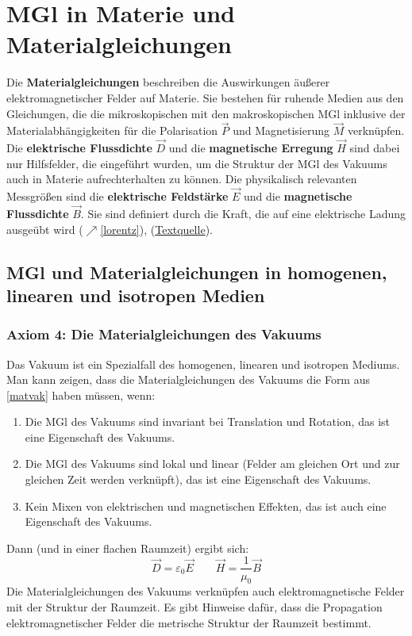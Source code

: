  \section{MGl in Materie und Materialgleichungen}\label{mat}
 Die \textbf{Materialgleichungen} beschreiben die Auswirkungen äußerer elektromagnetischer Felder auf Materie. Sie bestehen für ruhende Medien aus den Gleichungen, die die mikroskopischen mit den makroskopischen MGl inklusive der Materialabhängigkeiten für die Polarisation $\vec P$ und Magnetisierung $\vec M$ verknüpfen. Die \textbf{elektrische Flussdichte} $\vec D$ und die \textbf{magnetische Erregung} $\vec H$ sind dabei nur Hilfsfelder, die eingeführt wurden, um die Struktur der MGl des Vakuums auch in Materie aufrechterhalten zu können. Die physikalisch relevanten Messgrößen sind die \textbf{elektrische Feldstärke} $\vec E$ und die \textbf{magnetische Flussdichte} $\vec B$. Sie sind definiert durch die Kraft, die auf eine elektrische Ladung ausgeübt wird ($\nearrow$\ref{lorentz}), (\href{https://de.wikipedia.org/wiki/Materialgleichungen_der_Elektrodynamik}{Textquelle}).
 \subsection{MGl und Materialgleichungen in homogenen, linearen und isotropen Medien}
  \subsubsection{Axiom 4: Die Materialgleichungen des Vakuums}
  Das Vakuum ist ein Spezialfall des homogenen, linearen und isotropen Mediums. Man kann zeigen, dass die Materialgleichungen des Vakuums die Form aus \ref{matvak} haben müssen, wenn:
 \begin{enumerate}
 	\item Die MGl des Vakuums sind invariant bei Translation und Rotation, das ist
 	eine Eigenschaft des Vakuums.
 	\item Die MGl des Vakuums sind lokal und linear (Felder am gleichen Ort
 	und zur gleichen Zeit werden verknüpft), das ist eine Eigenschaft des Vakuums.
 	\item Kein Mixen von elektrischen und magnetischen Effekten, das ist auch eine Eigenschaft des Vakuums.
 \end{enumerate}
 Dann (und in einer flachen Raumzeit) ergibt sich:
 \begin{equation}\label{matvak}
 	\boxed{\vec{D} = \varepsilon_0\vec{E} \qquad \vec{H} = \frac{1}{\mu_{0}} \vec{B} }
 \end{equation}
 Die Materialgleichungen des Vakuums verknüpfen auch elektromagnetische Felder mit der Struktur der Raumzeit. Es gibt Hinweise dafür, dass die Propagation elektromagnetischer Felder die metrische Struktur der Raumzeit bestimmt.
